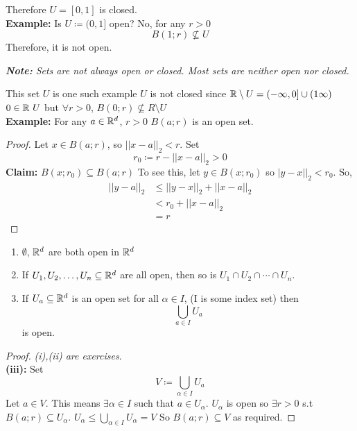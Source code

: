 \documentclass[openany]{report}
\begin{document}
Therefore $U = [0,1]$ is closed.\\[3ex]
\textbf{Example:} Is $U \coloneqq (0,1]$ open? No, for any $r > 0$
$$B(1;r) \not\subseteq U$$
Therefore, it is not open.\\[2ex]
\begin{center}
    \textit{\textbf{Note:} Sets are not always open or closed. Most sets are neither open nor closed.}
\end{center}
This set $U$ is one such example $U$ is not closed since $\mathbb{R} \setminus U = (-\infty, 0] \cup (1 \infty)$
$0 \in \mathbb{R} \ U$ but $\forall r >0$, $B(0;r) \not\subseteq R \setminus U$\\[3ex]
\textbf{Example:} For any $a \in \mathbb{R}^d$, $r > 0$ $B(a;r)$ is an open set.
\begin{proof}
    Let $x \in B(a;r)$, so $||x-a||_2 < r$. Set 
    $$r_0 \coloneqq r - ||x-a||_2 > 0$$
    \textbf{Claim:} $B(x; r_0) \subseteq B(a;r)$
    To see this, let $y \in B(x;r_0)$ so $|y-x||_2 < r_0$. So,
    \begin{align*}
        ||y-a||_2 &\leq ||y-x||_2 + ||x - a||_2\tag{$\triangle$-inequality} \\
        &< r_0 + ||x - a||_2\\
        &= r
    \end{align*}
\end{proof}
\begin{prop}
    \begin{enumerate}[label=(\roman*)]
        \item $\emptyset$, $\mathbb{R}^d$ are both open in $\mathbb{R}^d$
        \item If $U_1, U_2, \dots, U_n \subseteq \mathbb{R}^d$ are all open, then so is $U_1 \cap U_2 \cap \cdots \cap U_n$.
        \item If $U_a \subseteq \mathbb{R}^d$ is an open set for all $\alpha \in I$, (I is some index set) then 
        $$\bigcup_{a\in I} U_a$$
        is open.
    \end{enumerate}
\end{prop}
\begin{proof}
    \textit{(i),(ii) are exercises}.\\[2ex]
    \textbf{(iii):} Set 
    $$V \coloneqq \bigcup_{\alpha \in I} U_a$$
    Let $a \in V$. This means $\exists \alpha \in I$ such that $a \in U_\alpha$. $U_\alpha$ is open so $\exists r > 0$ s.t $B(a;r) \subseteq U_\alpha$. $U_\alpha \leq \bigcup_{\alpha \in I} U_\alpha = V$ So $B(a;r) \subseteq V$ as required.
\end{proof}
\noindent
\end{document}
